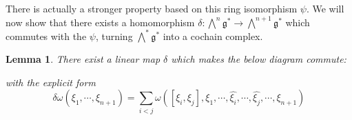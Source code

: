 \documentclass[12pt]{amsart}
\newtheorem{lemma}[theorem]{Lemma}
\numberwithin{equation}{section}
\begin{document}
There is actually a stronger property based on this ring isomorphism $\psi$. We will now show that there exists a homomorphism $\delta: \bigwedge^n\mathfrak{g}^* \rightarrow \bigwedge^{n+1}\mathfrak{g}^*$ which commutes with the $\psi$, turning $\bigwedge^*\mathfrak{g}^*$ into a cochain complex.
%
\begin{lemma}
There exist a linear map $\delta$ which makes the below diagram commute:
\begin{figure}[h!]
  \centering
\end{figure}

with the explicit form
\begin{equation}
  \delta\omega(\xi_1,\cdots, \xi_{n+1}) = \sum_{i < j} \omega([\xi_i,\xi_j], \xi_1,\cdots,\widehat{\xi_i},\cdots,\widehat{\xi_j},\cdots, \xi_{n+1})
\end{equation}
\end{lemma}
%
\end{document}
